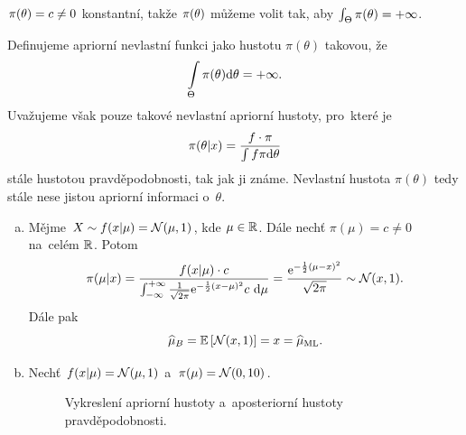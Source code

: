 $\pi(\theta)=c\neq0$ konstantní, takže $\pi(\theta)$ můžeme volit tak, aby $\int_\Theta\pi(\theta)=+\infty$.
\begin{define} Definujeme apriorní nevlastní funkci jako hustotu $\pi(\theta)$ takovou, že $$ \int\limits_{\Theta}{\pi(\theta)\mathrm{d}\theta} = +\infty.$$  Uvažujeme však pouze takové nevlastní apriorní hustoty, pro~které je 
	$$\pi(\theta|x)=\frac{f\cdot \pi}{\int f\pi\mathrm{d}\theta}$$ stále hustotou pravděpodobnosti, tak jak ji známe. Nevlastní hustota $\pi(\theta)$ tedy stále nese jistou apriorní informaci o~$\theta$.
\end{define}
\begin{example}\begin{enumerate}[a)]
		\item 
	Mějme $X\sim f(x|\mu)=\mathcal{N}(\mu,1)$, kde $\mu\in\mathbb{R}$. Dále nechť $\pi(\mu)=c\neq0$ na~celém $\mathbb{R}$. Potom$$ \pi(\mu|x)=\frac{f(x|\mu)\cdot c}{\int_{-\infty}^{+\infty}\frac{1}{\sqrt{2\pi}}\mathrm{e}^{-\frac{1}{2}(x-\mu)^2}c~\mathrm{d}\mu}=\frac{\mathrm{e}^{-\frac{1}{2}(\mu-x)^2}}{\sqrt{2\pi}}\sim\mathcal{N}(x,1).$$
	Dále pak 
	$$\widehat{\mu}_B=\mathbb{E}\left[ \mathcal{N}(x,1) \right]=x=\widehat{\mu}_{\mathrm{ML}}.$$
	\item Nechť $f(x|\mu)=\mathcal{N}(\mu,1)$ a~$\pi(\mu)=\mathcal{N}(0,10)$.
	
\begin{figure}[h]
	\centering
	\caption{Vykreslení apriorní hustoty a~aposteriorní hustoty pravděpodobnosti.}
\end{figure}
	


\end{enumerate}
\end{example}
